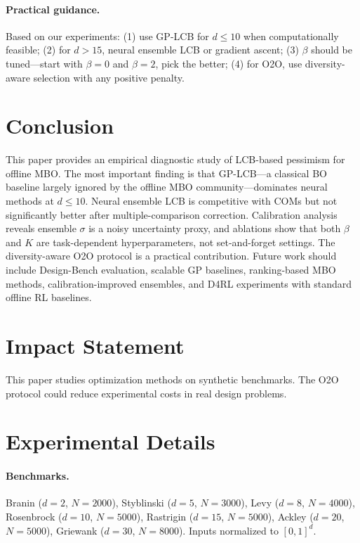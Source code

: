 \documentclass{article}
\theoremstyle{plain}
\theoremstyle{remark}
\begin{document}
\paragraph{Practical guidance.}
Based on our experiments: (1) use GP-LCB for $d \leq 10$ when computationally feasible; (2) for $d > 15$, neural ensemble LCB or gradient ascent; (3) $\beta$ should be tuned---start with $\beta{=}0$ and $\beta{=}2$, pick the better; (4) for O2O, use diversity-aware selection with any positive penalty.

\section{Conclusion}

This paper provides an empirical diagnostic study of LCB-based pessimism for offline MBO.
The most important finding is that GP-LCB---a classical BO baseline largely ignored by the offline MBO community---dominates neural methods at $d \leq 10$.
Neural ensemble LCB is competitive with COMs but not significantly better after multiple-comparison correction.
Calibration analysis reveals ensemble $\sigma$ is a noisy uncertainty proxy, and ablations show that both $\beta$ and $K$ are task-dependent hyperparameters, not set-and-forget settings.
The diversity-aware O2O protocol is a practical contribution.
Future work should include Design-Bench evaluation, scalable GP baselines, ranking-based MBO methods, calibration-improved ensembles, and D4RL experiments with standard offline RL baselines.

\section*{Impact Statement}
This paper studies optimization methods on synthetic benchmarks. The O2O protocol could reduce experimental costs in real design problems.




\newpage
\appendix
\onecolumn

\section{Experimental Details}
\label{app:details}

\paragraph{Benchmarks.}
Branin ($d{=}2$, $N{=}2000$), Styblinski ($d{=}5$, $N{=}3000$), Levy ($d{=}8$, $N{=}4000$), Rosenbrock ($d{=}10$, $N{=}5000$), Rastrigin ($d{=}15$, $N{=}5000$), Ackley ($d{=}20$, $N{=}5000$), Griewank ($d{=}30$, $N{=}8000$).
Inputs normalized to $[0,1]^d$.
\end{document}
